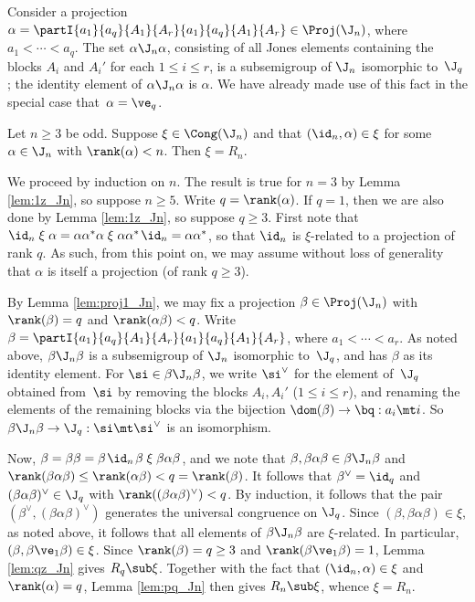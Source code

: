 Consider a projection $\alpha=\partI{a_1}{a_q}{A_1}{A_r}{a_1}{a_q}{A_1}{A_r}\in \Proj(\J_n)$, where $a_1<\cdots<a_q$.  The set $\alpha\J_n\alpha$, consisting of all Jones elements containing the blocks $A_i$ and $A_i'$ for each $1\leq i\leq r$, is a subsemigroup of $\J_n$ isomorphic to~$\J_q$; the identity element of $\alpha\J_n\alpha$ is $\alpha$.  We have already made use of this fact in the special case that~$\alpha=\ve_q$.




\begin{lemma}
\label{lem:1q_Jn}
Let $n\geq3$ be odd.  Suppose $\xi\in\Cong(\J_n)$ and that $(\id_n,\alpha)\in\xi$ for some $\alpha\in\J_n$ with $\rank(\alpha)<n$.  Then $\xi=R_n$.
\end{lemma}

\pf We proceed by induction on $n$.  The result is true for $n=3$ by Lemma
    \ref{lem:1z_Jn}, so suppose $n\geq5$.  Write $q=\rank(\alpha)$.  If
    $q=1$, then we are also done by Lemma \ref{lem:1z_Jn}, so suppose
    $q\geq3$.  First note that $\id_n \mathrel\xi \alpha = \alpha\alpha^*\alpha \mathrel\xi \alpha\alpha^*\;\!\id_n = \alpha\alpha^*$,
so that $\id_n$ is $\xi$-related to a projection of rank $q$.  As such, from this point on, we may assume without loss of generality that $\alpha$ is itself a projection (of rank $q\geq3$).  

By Lemma \ref{lem:proj1_Jn}, we may fix a projection $\beta\in \Proj(\J_n)$ with $\rank(\beta)=q$ and $\rank(\alpha\beta)<q$.  Write $\beta=\partI{a_1}{a_q}{A_1}{A_r}{a_1}{a_q}{A_1}{A_r}$, where $a_1<\cdots<a_r$.  As noted above, $\beta\J_n\beta$ is a subsemigroup of $\J_n$ isomorphic to~$\J_q$, and has $\beta$ as its identity element.  For $\si\in\beta\J_n\beta$, we write $\si^\vee$ for the element of~$\J_q$ obtained from~$\si$ by removing the blocks $A_i,A_i'$ ($1\leq i\leq r$), and renaming the elements of the remaining blocks via the bijection $\dom(\beta)\to\bq:a_i\mt i$.  So $\beta\J_n\beta\to\J_q:\si\mt\si^\vee$ is an isomorphism.

Now, $\beta=\beta\beta=\beta\;\!\id_n\;\!\beta \mathrel\xi \beta\alpha\beta$, and we note that $\beta,\beta\alpha\beta\in\beta\J_n\beta$ and $\rank(\beta\alpha\beta)\leq\rank(\alpha\beta)<q=\rank(\beta)$.  It follows that $\beta^\vee=\id_q$ and $(\beta\alpha\beta)^\vee\in\J_q$ with ${\rank((\beta\alpha\beta)^\vee)<q}$.  
By induction, it follows that the pair $(\beta^\vee,(\beta\alpha\beta)^\vee)$ generates the universal congruence on $\J_q$.  Since $(\beta,\beta\alpha\beta)\in\xi$, as noted above, it follows that all elements of $\beta\J_n\beta$ are $\xi$-related.  In particular, $(\beta,\beta\ve_1\beta)\in\xi$.  Since $\rank(\beta)=q\geq3$ and $\rank(\beta\ve_1\beta)=1$, Lemma \ref{lem:qz_Jn} gives $R_q\sub\xi$.  Together with the fact that $(\id_n,\alpha)\in\xi$ and $\rank(\alpha)=q$, Lemma \ref{lem:pq_Jn} then gives $R_n\sub\xi$, whence $\xi=R_n$. \epf



